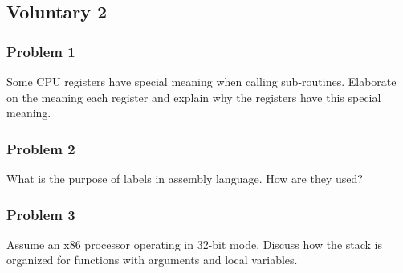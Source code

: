 
\subsection*{Voluntary 2}
\subsubsection*{Problem 1}
Some CPU registers have special meaning when calling sub-routines. Elaborate on the meaning each register and explain why the registers have this special meaning.

\subsubsection*{Problem 2}
What is the purpose of labels in assembly language. How are they used?

\subsubsection*{Problem 3}
Assume an x86 processor operating in 32-bit mode. Discuss how the stack is organized for functions with arguments and local variables.
